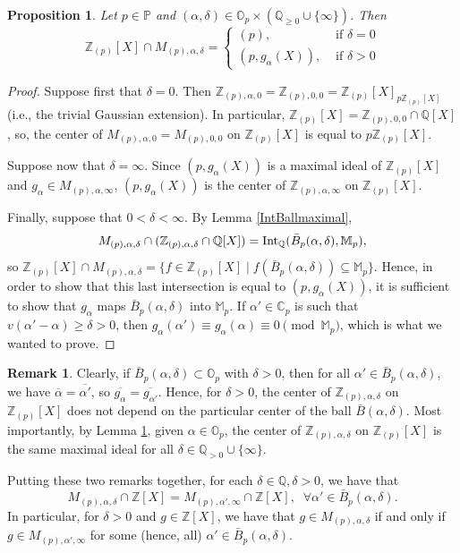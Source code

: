\documentclass[10pt]{article}
\numberwithin{equation}{section}
\newtheorem{Prop}[equation]{Proposition}
\theoremstyle{definition}
\newtheorem{Rem}[equation]{Remark}
\theoremstyle{definition}
\newcommand{\Q}{\mathbb{Q}}
\newcommand{\Z}{\mathbb{Z}}
\newcommand{\C}{\mathbb{C}}
\renewcommand{\O}{\mathbb{O}}
\newcommand{\PP}{\mathbb{P}}
\newcommand{\Int}{\textnormal{Int}}
\newcommand{\IntQ}{\Int_{\Q}}
\begin{document}
\begin{Prop}\label{contraction maximal ideal}
Let $p\in\PP$ and $(\alpha,\delta)\in\O_p\times(\Q_{\geq0}\cup\{\infty\})$. Then
$$\Z_{(p)}[X]\cap M_{(p),\alpha,\delta}=\left\{\begin{array}{lc}
(p),&\text{ if } \delta=0\\
(p,g_{\alpha}(X)),&\text{ if } \delta>0
\end{array}\right.$$
\end{Prop}
\begin{proof} Suppose first that $\delta=0$. Then $\Z_{(p),\alpha,0}=\Z_{(p),0,0}= \Z_{(p)}[X]_{p\Z_{(p)}[X]}$ (i.e., the trivial Gaussian extension).
In particular, $\Z_{(p)}[X]=\Z_{(p),0,0}\cap\Q[X]$, so, the center of $M_{(p),\alpha,0}=M_{(p),0,0}$ on $\Z_{(p)}[X]$ is equal to $p\Z_{(p)}[X]$.

Suppose now that $\delta=\infty$. Since $(p,g_{\alpha}(X))$  is a maximal ideal of $\Z_{(p)}[X]$ and $g_{\alpha}\in M_{(p),\alpha,\infty}$,  $(p,g_{\alpha}(X))$ is the center of $\Z_{(p),\alpha,\infty}$ on $\Z_{(p)}[X]$.

Finally, suppose that $0<\delta<\infty$. By Lemma \ref{IntBallmaximal}, 
$$M_{(p),\alpha,\delta}\cap(\Z_{(p),\alpha,\delta}\cap\Q[X])=\IntQ(\bar B_p(\alpha,\delta),\mathbb M_p),$$ 
so $\Z_{(p)}[X]\cap M_{(p),\alpha,\delta}=\{f\in\Z_{(p)}[X]\mid f(\bar B_p(\alpha,\delta))\subseteq\mathbb M_p\}$. 
Hence, in order to show that this last intersection is equal to $(p,g_{\alpha}(X))$, it is sufficient to show that $g_{\alpha}$ maps $\bar B_p(\alpha,\delta)$ into $\mathbb M_p$. If $\alpha'\in\C_p$ is such that $v(\alpha'-\alpha)\geq\delta>0$, then $g_{\alpha}(\alpha')\equiv g_{\alpha}(\alpha)\equiv 0\pmod{\mathbb M_p}$, which is what we wanted to prove.
\end{proof}

\begin{Rem}\label{collapse centers DVRs}
Clearly, if $\bar B_p(\alpha,\delta)\subset\O_p$ with $\delta>0$, then for all $\alpha'\in \bar B_p(\alpha,\delta)$, 
we have $\overline{\alpha}=\overline{\alpha'}$, so $\overline{g_{\alpha}}=\overline{g_{\alpha'}}$. 
Hence, for $\delta>0$, the center of $\Z_{(p),\alpha,\delta}$ on $\Z_{(p)}[X]$ does not depend on the particular center of the ball $\bar B(\alpha,\delta)$.
Most importantly, by Lemma \ref{contraction maximal ideal}, given $\alpha\in\O_p$, 
the center of $\Z_{(p),\alpha,\delta}$ on $\Z_{(p)}[X]$ is the same maximal ideal for all $\delta\in\Q_{>0}\cup\{\infty\}$.  

Putting these two remarks together, for each $\delta\in\Q,\delta>0$, we have that
$$M_{(p),\alpha,\delta}\cap\Z[X]=M_{(p),\alpha',\infty}\cap\Z[X],\;\;\forall\alpha'\in\bar B_p(\alpha,\delta).$$
In particular, for $\delta>0$ and $g\in\Z[X]$, we have that $g\in M_{(p),\alpha,\delta}$ 
if and only if $g\in M_{(p),\alpha',\infty}$ for some  (hence, all) $\alpha'\in \bar B_p(\alpha,\delta)$.
\end{Rem}
\end{document}
